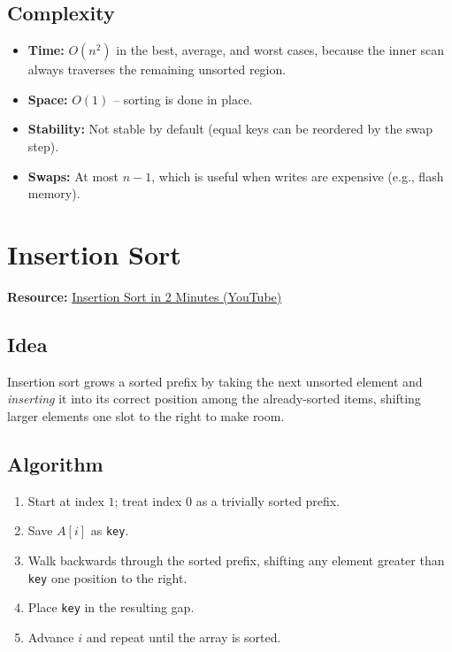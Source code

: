 \documentclass[11pt]{article}
\begin{document}
\subsection*{Complexity}
\begin{itemize}[leftmargin=*]
    \item \textbf{Time:} $O(n^2)$ in the best, average, and worst cases, because
          the inner scan always traverses the remaining unsorted region.
    \item \textbf{Space:} $O(1)$ -- sorting is done in place.
    \item \textbf{Stability:} Not stable by default (equal keys can be reordered
          by the swap step).
    \item \textbf{Swaps:} At most $n-1$, which is useful when writes are
          expensive (e.g., flash memory).
\end{itemize}

\section{Insertion Sort}
\textbf{Resource:} \href{https://www.youtube.com/watch?v=JU767SDMDvA}{Insertion Sort in 2 Minutes (YouTube)}

\subsection*{Idea}
Insertion sort grows a sorted prefix by taking the next unsorted element and
\emph{inserting} it into its correct position among the already-sorted items,
shifting larger elements one slot to the right to make room.

\subsection*{Algorithm}
\begin{enumerate}[leftmargin=*]
    \item Start at index $1$; treat index $0$ as a trivially sorted prefix.
    \item Save $A[i]$ as \texttt{key}.
    \item Walk backwards through the sorted prefix, shifting any element
          greater than \texttt{key} one position to the right.
    \item Place \texttt{key} in the resulting gap.
    \item Advance $i$ and repeat until the array is sorted.
\end{enumerate}
\end{document}
